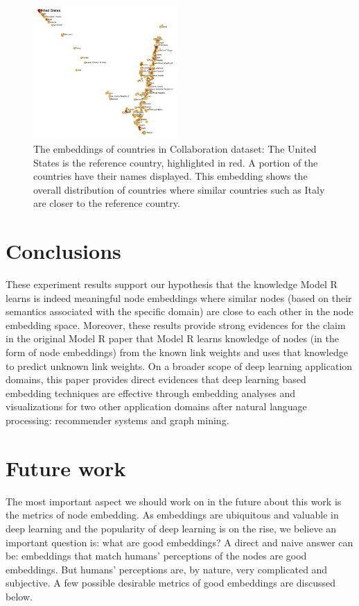 \documentclass[conference]{IEEEtran}
\begin{document}
\begin{figure}[!ht]\centering
	\includegraphics[width=0.49\textwidth]{countries}
	\caption{
		The embeddings of countries in Collaboration dataset:
		The United States is the reference country, highlighted in red.
		A portion of the countries have their names displayed.
		This embedding shows the overall distribution of countries where similar countries such as Italy are closer to the reference country.
	}
	\label{fig:countries}
\end{figure}

\section{Conclusions}
These experiment results support our hypothesis that the knowledge Model R learns is indeed meaningful node embeddings where similar nodes (based on their semantics associated with the specific domain) are close to each other in the node embedding space.
Moreover, these results provide strong evidences for the claim in the original Model R paper that Model R learns knowledge of nodes (in the form of node embeddings) from the known link weights and uses that knowledge to predict unknown link weights.
On a broader scope of deep learning application domains, this paper provides direct evidences that deep learning based embedding techniques are effective through embedding analyses and visualizations for two other application domains after natural language processing: recommender systems and graph mining.

\section{Future work}
The most important aspect we should work on in the future about this work is the metrics of node embedding.
As embeddings are ubiquitous and valuable in deep learning and the popularity of deep learning is on the rise, we believe an important question is: what are good embeddings?
A direct and naive answer can be: embeddings that match humans' perceptions of the nodes are good embeddings.
But humans' perceptions are, by nature, very complicated and subjective.
A few possible desirable metrics of good embeddings are discussed below.
\end{document}
